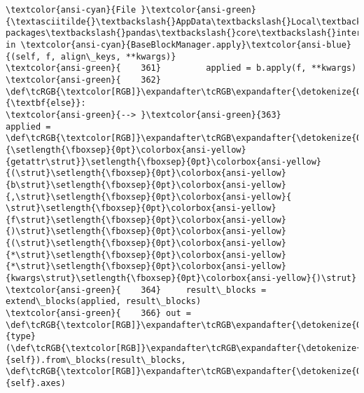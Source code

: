 \documentclass[11pt]{article}
\begin{document}
\begin{Verbatim}[commandchars=\\\{\}, frame=single, framerule=2mm, rulecolor=\color{outerrorbackground}]
\textcolor{ansi-cyan}{File }\textcolor{ansi-green}{\textasciitilde{}\textbackslash{}AppData\textbackslash{}Local\textbackslash{}Programs\textbackslash{}Python\textbackslash{}Python313\textbackslash{}Lib\textbackslash{}site-packages\textbackslash{}pandas\textbackslash{}core\textbackslash{}internals\textbackslash{}managers.py:363}, in \textcolor{ansi-cyan}{BaseBlockManager.apply}\textcolor{ansi-blue}{(self, f, align\_keys, **kwargs)}
\textcolor{ansi-green}{    361}         applied = b.apply(f, **kwargs)
\textcolor{ansi-green}{    362}     \def\tcRGB{\textcolor[RGB]}\expandafter\tcRGB\expandafter{\detokenize{0,135,0}}{\textbf{else}}:
\textcolor{ansi-green}{--> }\textcolor{ansi-green}{363}         applied = \def\tcRGB{\textcolor[RGB]}\expandafter\tcRGB\expandafter{\detokenize{0,135,0}}{\setlength{\fboxsep}{0pt}\colorbox{ansi-yellow}{getattr\strut}}\setlength{\fboxsep}{0pt}\colorbox{ansi-yellow}{(\strut}\setlength{\fboxsep}{0pt}\colorbox{ansi-yellow}{b\strut}\setlength{\fboxsep}{0pt}\colorbox{ansi-yellow}{,\strut}\setlength{\fboxsep}{0pt}\colorbox{ansi-yellow}{ \strut}\setlength{\fboxsep}{0pt}\colorbox{ansi-yellow}{f\strut}\setlength{\fboxsep}{0pt}\colorbox{ansi-yellow}{)\strut}\setlength{\fboxsep}{0pt}\colorbox{ansi-yellow}{(\strut}\setlength{\fboxsep}{0pt}\colorbox{ansi-yellow}{*\strut}\setlength{\fboxsep}{0pt}\colorbox{ansi-yellow}{*\strut}\setlength{\fboxsep}{0pt}\colorbox{ansi-yellow}{kwargs\strut}\setlength{\fboxsep}{0pt}\colorbox{ansi-yellow}{)\strut}
\textcolor{ansi-green}{    364}     result\_blocks = extend\_blocks(applied, result\_blocks)
\textcolor{ansi-green}{    366} out = \def\tcRGB{\textcolor[RGB]}\expandafter\tcRGB\expandafter{\detokenize{0,135,0}}{type}(\def\tcRGB{\textcolor[RGB]}\expandafter\tcRGB\expandafter{\detokenize{0,135,0}}{self}).from\_blocks(result\_blocks, \def\tcRGB{\textcolor[RGB]}\expandafter\tcRGB\expandafter{\detokenize{0,135,0}}{self}.axes)


\end{Verbatim}
\end{document}
